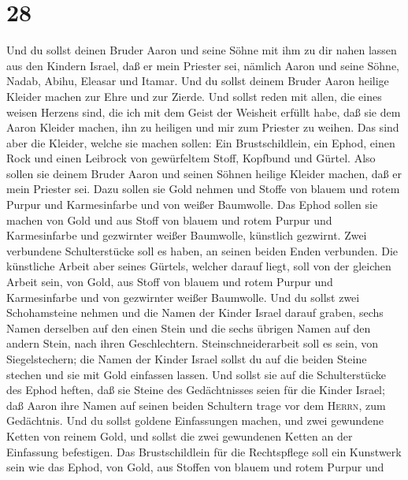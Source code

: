 \hypertarget{section-27}{%
\section{28}\label{section-27}}

 Und du sollst deinen Bruder Aaron und seine Söhne mit ihm
zu dir nahen lassen aus den Kindern Israel, daß er mein Priester sei,
nämlich Aaron und seine Söhne, Nadab, Abihu, Eleasar und Itamar.
 Und du sollst deinem Bruder Aaron heilige Kleider machen
zur Ehre und zur Zierde.  Und sollst reden mit allen, die
eines weisen Herzens sind, die ich mit dem Geist der Weisheit erfüllt
habe, daß sie dem Aaron Kleider machen, ihn zu heiligen und mir zum
Priester zu weihen.  Das sind aber die Kleider, welche sie
machen sollen: Ein Brustschildlein, ein Ephod, einen Rock und einen
Leibrock von gewürfeltem Stoff, Kopfbund und Gürtel. Also sollen sie
deinem Bruder Aaron und seinen Söhnen heilige Kleider machen, daß er
mein Priester sei.  Dazu sollen sie Gold nehmen und Stoffe
von blauem und rotem Purpur und Karmesinfarbe und von weißer Baumwolle.
 Das Ephod sollen sie machen von Gold und aus Stoff von
blauem und rotem Purpur und Karmesinfarbe und gezwirnter weißer
Baumwolle, künstlich gezwirnt.  Zwei verbundene
Schulterstücke soll es haben, an seinen beiden Enden verbunden.
 Die künstliche Arbeit aber seines Gürtels, welcher darauf
liegt, soll von der gleichen Arbeit sein, von Gold, aus Stoff von blauem
und rotem Purpur und Karmesinfarbe und von gezwirnter weißer Baumwolle.
 Und du sollst zwei Schohamsteine nehmen und die Namen der
Kinder Israel darauf graben,  sechs Namen derselben auf
den einen Stein und die sechs übrigen Namen auf den andern Stein, nach
ihren Geschlechtern.  Steinschneiderarbeit soll es sein,
von Siegelstechern; die Namen der Kinder Israel sollst du auf die beiden
Steine stechen und sie mit Gold einfassen lassen.  Und
sollst sie auf die Schulterstücke des Ephod heften, daß sie Steine des
Gedächtnisses seien für die Kinder Israel; daß Aaron ihre Namen auf
seinen beiden Schultern trage vor dem \textsc{Herrn}, zum Gedächtnis.
 Und du sollst goldene Einfassungen machen,
 und zwei gewundene Ketten von reinem Gold, und sollst
die zwei gewundenen Ketten an der Einfassung befestigen. 
Das Brustschildlein für die Rechtspflege soll ein Kunstwerk sein wie das
Ephod, von Gold, aus Stoffen von blauem und rotem Purpur und
